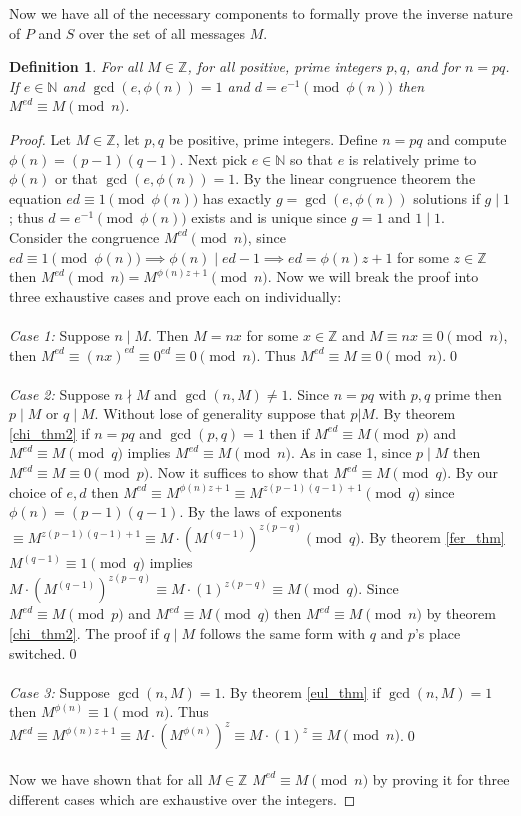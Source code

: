 \documentclass[12pt]{article}
\newcommand{\Z}{\mathbb{Z}}
\newcommand{\N}{\mathbb{N}}
\newtheorem{definition}{Definition}[section]
\theoremstyle{remark}
\begin{document}
Now we have all of the necessary components to formally prove the inverse nature of $P$ and $S$ over the set of all messages $M$.

\begin{definition}
\label{inv_thm}
For all $M\in \Z$, for all positive, prime integers $p,q$, and for $n=pq$.  If $e\in \N$ and $\gcd(e,\phi(n))=1$ and $d = e^{-1}\pmod{\phi(n)}$ then $M^{ed}\equiv M \pmod{n}$.
\end{definition}

\begin{proof}
Let $M\in \Z$, let $p,q$ be positive, prime integers.  Define $n=pq$ and compute ${\phi(n) = (p-1)(q-1)}$.  Next pick $e\in \N$ so that $e$ is relatively prime to $\phi(n)$ or that $\gcd(e,\phi(n))=1$.  By the linear congruence theorem the equation $ed \equiv 1 \pmod{\phi(n)}$ has exactly $g = \gcd(e,\phi(n))$ solutions if $g \mid 1$; thus $d = e^{-1} \pmod{\phi(n)}$ exists and is unique since $g=1$ and $1\mid 1$.\\
Consider the congruence $M^{ed}\pmod{n}$, since $ed \equiv 1 \pmod{\phi(n)} \implies \phi(n) \mid ed-1 \implies ed = \phi(n)z+1$ for some $z \in \Z$ then $M^{ed}\pmod{n} = M^{\phi(n)z+1}\pmod{n}$.  Now we will break the proof into three exhaustive cases and prove each on individually:\\\\
\emph{Case 1:} Suppose $n \mid M$.  Then $M=nx$ for some $x\in \Z$ and $M \equiv nx \equiv 0 \pmod{n}$, then $M^{ed} \equiv {(nx)}^{ed} \equiv 0^{ed} \equiv 0 \pmod{n}$.  Thus $M^{ed} \equiv M \equiv 0 \pmod{n}$.\qed
\\\\
\emph{Case 2:} Suppose $n\nmid M$ and $\gcd(n,M) \neq 1$. Since $n=pq$ with $p,q$ prime then $p \mid M$ or $q \mid M$.  Without lose of generality suppose that $p | M$.  By theorem \ref{chi_thm2} if $n = pq$ and $\gcd(p,q)=1$ then if $M^{ed} \equiv M \pmod{p}$ and $M^{ed} \equiv M \pmod{q}$ implies $M^{ed} \equiv M \pmod{n}$.  As in case 1, since $p \mid M$ then $M^{ed} \equiv M \equiv 0 \pmod{p}$.  Now it suffices to show that $M^{ed} \equiv M \pmod{q}$.  By our choice of $e,d$ then $M^{ed} \equiv M^{\phi(n)z+1} \equiv M^{z(p-1)(q-1) + 1} \pmod{q}$ since $\phi(n) = (p-1)(q-1)$.  By the laws of exponents $\equiv M^{z(p-1)(q-1) + 1}\equiv M\cdot (M^{(q-1)})^{z(p-q)} \pmod{q}$.  By theorem \ref{fer_thm} $M^{(q-1)} \equiv 1 \pmod{q}$ implies $M\cdot (M^{(q-1)})^{z(p-q)} \equiv {M\cdot (1)^{z(p-q)} \equiv M \pmod{q}}$.  Since $M^{ed} \equiv M \pmod{p}$ and $M^{ed} \equiv M \pmod{q}$ then $M^{ed} \equiv M \pmod{n}$ by theorem \ref{chi_thm2}.  The proof if $q\mid M$ follows the same form with $q$ and $p$'s place switched.\qed
\\\\
\emph{Case 3:} Suppose $\gcd(n,M)=1$.  By theorem \ref{eul_thm} if $\gcd(n,M)=1$ then $M^{\phi(n)} \equiv 1  \pmod{n}$.  Thus $M^{ed} \equiv M^{\phi(n)z+1} \equiv M\cdot (M^{\phi(n)})^z \equiv M \cdot (1)^z \equiv M \pmod{n}$.\qed
\\\\
Now we have shown that for all $M\in \Z$ $M^{ed} \equiv M \pmod{n}$ by proving it for three different cases which are exhaustive over the integers.
\end{proof}
\end{document}
